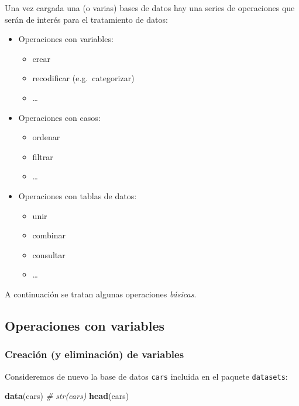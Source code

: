 \documentclass[]{book}
\newenvironment{Shaded}{\begin{snugshade}}{\end{snugshade}}
\newcommand{\CommentTok}[1]{\textcolor[rgb]{0.56,0.35,0.01}{\textit{#1}}}
\newcommand{\KeywordTok}[1]{\textcolor[rgb]{0.13,0.29,0.53}{\textbf{#1}}}
\newcommand{\NormalTok}[1]{#1}
\providecommand{\tightlist}{%
  \setlength{\itemsep}{0pt}\setlength{\parskip}{0pt}}
\begin{document}
Una vez cargada una (o varias) bases
de datos hay una series de operaciones que serán de interés para el
tratamiento de datos:

\begin{itemize}
\tightlist
\item
  Operaciones con variables:

  \begin{itemize}
  \tightlist
  \item
    crear
  \item
    recodificar (e.g.~categorizar)
  \item
    \ldots{}
  \end{itemize}
\item
  Operaciones con casos:

  \begin{itemize}
  \tightlist
  \item
    ordenar
  \item
    filtrar
  \item
    \ldots{}
  \end{itemize}
\item
  Operaciones con tablas de datos:

  \begin{itemize}
  \tightlist
  \item
    unir
  \item
    combinar
  \item
    consultar
  \item
    \ldots{}
  \end{itemize}
\end{itemize}

A continuación se tratan algunas operaciones \emph{básicas}.

\hypertarget{operaciones-con-variables}{%
\subsection{Operaciones con variables}\label{operaciones-con-variables}}

\hypertarget{creacion-y-eliminacion-de-variables}{%
\subsubsection{Creación (y eliminación) de variables}\label{creacion-y-eliminacion-de-variables}}

Consideremos de nuevo la
base de datos \texttt{cars} incluida en el paquete \texttt{datasets}:

\begin{Shaded}
\begin{Highlighting}[]
\KeywordTok{data}\NormalTok{(cars)}
\CommentTok{# str(cars)}
\KeywordTok{head}\NormalTok{(cars)}
\end{Highlighting}
\end{Shaded}
\end{document}
